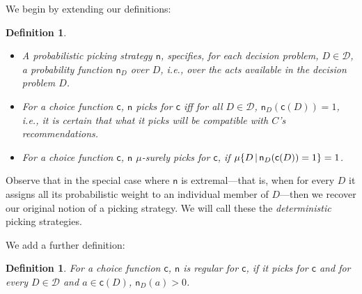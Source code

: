 \documentclass[a4paper,final]{article}
\newtheorem{definition}[theorem]{Definition}
\newcommand\A{\mathcal{A}}
\renewcommand\P{\mathbb{P}} %
\newcommand\EU{\mathrm{EU}}
\newcommand\REU{\mathrm{REU}}
\newcommand\EAd{\mathrm{EAd}}
\newcommand\Maximin{\Gamma}
\newcommand{\D}{\mathcal{D}}
\newcommand\s{\mathsf{s}}
\renewcommand\c{\mathsf{c}} %
\newcommand{\n}{\mathsf{n}}
\newcommand{\IP}{\P}
\newcommand{\todoold}[2][]{\todo[backgroundcolor=white,bordercolor=orange!10,linecolor=gray!10, #1,caption={},textcolor=gray]{Pre-rev: #2}}
\newcommand{\todooldinfo}[2][]{\todoold[#1]{#2}}
\renewcommand{\color}[1]{}
\newcommand\SetDelimiter[1][]{
	\nonscript\,#1\vert \allowbreak \nonscript\,\mathopen{}}
\providecommand\given{\SetDelimiter}
\renewcommand{\emptyset}{\varnothing}
\newenvironment{CCM rewritten}
{\begingroup\color{blue}} %
{\endgroup}              %
\begin{document}
We begin by extending our definitions:
\begin{definition}\label{def:nu stuff}\ 
	\begin{itemize}
		\item %
		A \emph{probabilistic picking strategy} $\n$, specifies, for each decision problem, $D\in\D$, a probability function $\n_D$ over $D$, i.e., over the acts available in the decision problem $D$.
		\item For a choice function $\c$,  $\n$ \emph{picks for $\c$} iff for all $D\in\D$,  $\n_D(\c(D))=1$, i.e., it is certain that what it picks will be compatible with $C$'s recommendations.
		\item For a choice function $\c$, $\n$ \emph{$\mu$-surely picks for $\c$}, if $\mu\{D\given \n_D(\c(D))=1\}=1$.
 	\end{itemize}
\end{definition}
Observe that in the special case where $\n$ is extremal---that is, when for every $D$ it assigns all its probabilistic weight to an individual member of $D$---then we recover our original notion of a picking strategy. We will call these the \emph{deterministic} picking strategies. 

We add a further definition: 
\begin{definition}
For a choice function $\c$,  \emph{$\n$ is regular for $\c$}, if it picks for $\c$ and for every $D\in\D$ and $a\in\c(D)$, $\n_D(a)>0$. %
\end{definition}


\end{document}
